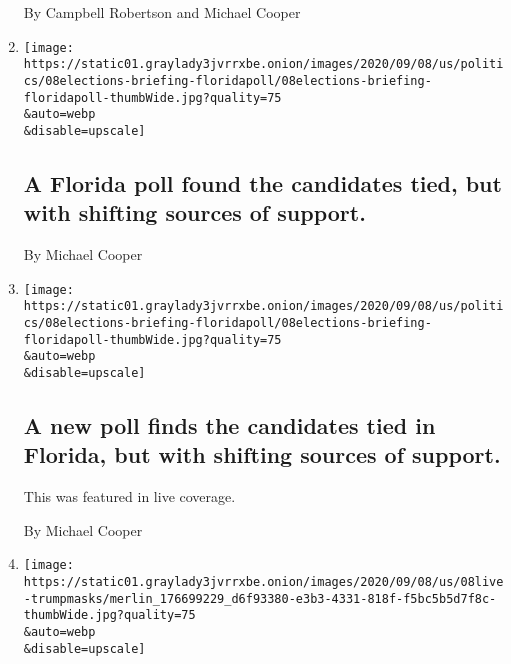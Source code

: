 \begin{enumerate}
  By Campbell Robertson and Michael Cooper
\item
  \href{/2020/09/09/us/elections/a-florida-poll-found-the-candidates-tied-but-with-shifting-sources-of-support.html}{}

  \texttt{[image: https://static01.graylady3jvrrxbe.onion/images/2020/09/08/us/politics/08elections-briefing-floridapoll/08elections-briefing-floridapoll-thumbWide.jpg?quality=75\\\&auto=webp\\\&disable=upscale]}

  \hypertarget{a-florida-poll-found-the-candidates-tied-but-with-shifting-sources-of-support}{%
  \subsection{A Florida poll found the candidates tied, but with
  shifting sources of
  support.}\label{a-florida-poll-found-the-candidates-tied-but-with-shifting-sources-of-support}}

  By Michael Cooper
\item
  \href{/live/2020/09/08/us/trump-vs-biden/a-new-poll-finds-the-candidates-tied-in-florida-but-with-shifting-sources-of-support}{}

  \texttt{[image: https://static01.graylady3jvrrxbe.onion/images/2020/09/08/us/politics/08elections-briefing-floridapoll/08elections-briefing-floridapoll-thumbWide.jpg?quality=75\\\&auto=webp\\\&disable=upscale]}

  \hypertarget{a-new-poll-finds-the-candidates-tied-in-florida-but-with-shifting-sources-of-support}{%
  \subsection{A new poll finds the candidates tied in Florida, but with
  shifting sources of
  support.}\label{a-new-poll-finds-the-candidates-tied-in-florida-but-with-shifting-sources-of-support}}

  This was featured in live coverage.

  By Michael Cooper
\item
  \href{/live/2020/09/08/us/trump-vs-biden/the-president-denounces-coronavirus-restrictions-biden-has-questions-about-proposed-vaccine}{}

  \texttt{[image: https://static01.graylady3jvrrxbe.onion/images/2020/09/08/us/08live-trumpmasks/merlin\_176699229\_d6f93380-e3b3-4331-818f-f5bc5b5d7f8c-thumbWide.jpg?quality=75\\\&auto=webp\\\&disable=upscale]}

  \hypertarget{the-president-denounces-coronavirus-restrictions-biden-has-questions-about-proposed-vaccine}{%
}
\end{enumerate}

